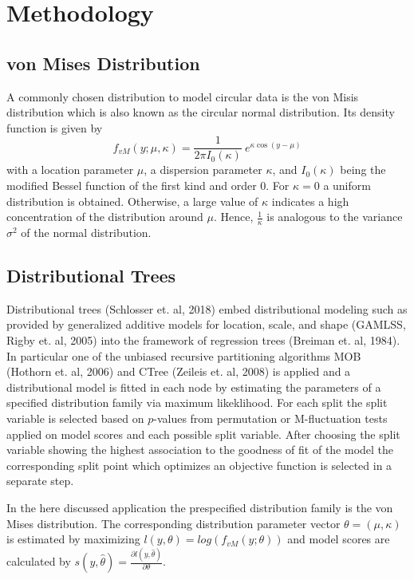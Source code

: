 \documentclass[twoside]{report}
\begin{document}
\section{Methodology}

\subsection{von Mises Distribution}
A commonly chosen distribution to model circular data is the von Misis distribution
which is also known as the circular normal distribution. Its density function is given by
\begin{equation}
  f_{vM}(y; \mu, \kappa) = \frac{1}{2 \pi I_0(\kappa)}~e^{ \kappa \cos(y - \mu)}\label{equ:vm}
\end{equation}
with a location parameter $\mu$, a dispersion parameter $\kappa$, and $I_0(\kappa)$ being the 
modified Bessel function of the first kind and order $0$.
For $\kappa=0$ a uniform distribution is obtained. Otherwise, a large value of $\kappa$ indicates
a high concentration of the distribution around $\mu$. Hence, $\frac{1}{\kappa}$ is analogous
to the variance $\sigma^2$ of the normal distribution.


\subsection{Distributional Trees}
Distributional trees (Schlosser et. al, 2018) embed distributional modeling such as
provided by generalized additive models for location, scale, and shape 
(GAMLSS, Rigby et. al, 2005) into the framework of regression trees (Breiman et. al, 1984).
In particular one of the unbiased recursive partitioning algorithms MOB (Hothorn et. al, 2006) 
and CTree (Zeileis et. al, 2008) is applied and a distributional model is fitted in each node 
by estimating the parameters of a specified distribution family via maximum likeklihood.
For each split the split variable is selected based on $p$-values from permutation or M-fluctuation 
tests applied on model scores and each possible split variable. After choosing the split variable 
showing the highest association to the goodness of fit of the model the corresponding split point 
which optimizes an objective function is selected in a separate step.

In the here discussed application the prespecified distribution family is the von Mises distribution. 
The corresponding distribution parameter vector $\theta = (\mu,\kappa)$ is estimated 
by maximizing $l(y, \theta) = log(f_{vM}(y;\theta))$ and model scores are calculated 
by $s(y,\hat{\theta}) = \frac{\partial l(y, \hat{\theta})}{\partial \theta}$. 
\end{document}
